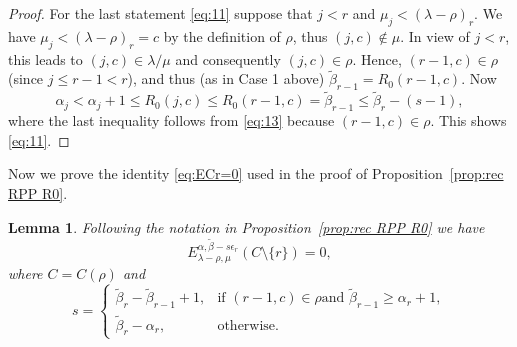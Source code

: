 \documentclass[12pt]{amsart}
\numberwithin{equation}{section}
\newtheorem{lem}[thm]{Lemma}
\theoremstyle{definition}
\newcommand\wb{\widetilde{\beta}}
\newcommand\lm{{\lambda/\mu}}
\begin{document}
\begin{proof}
  For the last statement \eqref{eq:11} suppose that $j<r$ and
  $\mu_j<(\lambda-\rho)_r$. We have $\mu_j<(\lambda-\rho)_r=c$ by
  the definition of $\rho$, thus $(j,c)\notin\mu$. In view of
  $j<r$, this leads to $(j,c) \in \lm$ and consequently
  $(j,c)\in \rho$. Hence, $(r-1,c)\in \rho$ (since $j \le r-1 < r$),
  and thus (as in Case 1 above) $\wb_{r-1}=R_0(r-1,c)$.
  Now
\[
\alpha_j < \alpha_j+1 \le R_0(j,c) \le R_0(r-1,c) = \wb_{r-1}\le \wb_r-(s-1),
\]
where the last inequality follows from \eqref{eq:13} because $(r-1,c)\in\rho$.
This shows \eqref{eq:11}.
\end{proof}

Now we prove the identity \eqref{eq:ECr=0} used in the proof of
Proposition~\ref{prop:rec RPP R0}.

\begin{lem}\label{lem:s}
  Following the notation in Proposition~\ref{prop:rec RPP R0} we have
  \begin{equation}\label{eq:e0}
E_{\lambda-\rho,\mu}^{\alpha,\wb-s\epsilon_r}(C\setminus\{r\}) = 0,
  \end{equation}
  where $C=C(\rho)$ and 
      \[
s = \begin{cases}
  \wb_r-\wb_{r-1}+1, & \mbox{if $(r-1,c)\in\rho$
  and $\wb_{r-1}\ge\alpha_r+1$} ,\\
\wb_r-\alpha_r, &\mbox{otherwise} . 
\end{cases}
  \]
\end{lem}
\end{document}
